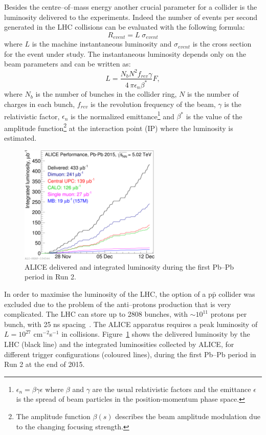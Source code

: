 Besides the centre–of–mass energy another crucial parameter for a collider is the luminosity
delivered to the experiments.
Indeed the number of events per second generated in the LHC collisions can be evaluated with the
following formula:
\begin{equation}
    R_{event} = L\;\sigma_{event}
\end{equation}
where $L$ is the machine instantaneous luminosity and $\sigma_{event}$ is the cross section for
the event under study. The instantaneous luminosity depends only on the beam parameters and can be 
written as:
\begin{equation}
    L = \frac{N_{b}N^{2} f_{rev} \gamma}{4\,\pi \epsilon_{n} \beta^{*}} F,
\end{equation}
where $N_{b}$ is the number of bunches in the collider ring, $N$ is the number of charges in each
bunch, $f_{rev}$ is the revolution frequency of the beam, $\gamma$ is the relativistic factor,
$\epsilon_{n}$ is the normalized emittance\footnote{$\epsilon_{n} = \beta \gamma \epsilon$ 
where $\beta$ and $\gamma$ are the usual relativistic factors and the emittance $\epsilon$ is the
spread of beam particles in the position-momentum phase space.} and $\beta^{*}$ is the value 
of the amplitude function\footnote{The amplitude function $\beta(s)$ describes the beam 
amplitude modulation due to the changing focusing strength.} at the interaction point (IP)
where the luminosity is estimated.

\begin{figure}
    \centering
    \includegraphics[width=0.6\textwidth]{gfx/alicelumi}
	\caption{ALICE delivered and integrated luminosity during the first Pb–Pb period in Run 2.}
	\label{fig:alicelumi}
\end{figure}

In order to maximise the luminosity of the LHC, the option of a p$\bar{\mathrm{p}}$ collider
was excluded due to the problem of the anti–protons production that is very complicated.
The LHC can store up to 2808 bunches, with $\sim 10^{11}$ protons per bunch, with 25 ns 
spacing~\cite{lhcperf}.
The ALICE apparatus requires a peak luminosity of $L = 10^{27}$ cm$^{-2}$s$^{-1}$ in \PbPb 
collisions.
Figure~\ref{fig:alicelumi} shows the delivered luminosity by the LHC (black line) and the integrated
luminosities collected by ALICE, for different trigger configurations (coloured lines), during the
first Pb–Pb period in Run 2 at the end of 2015.

